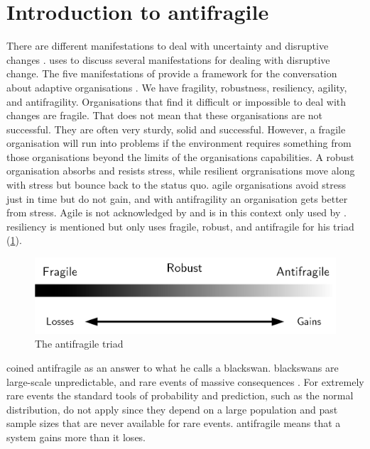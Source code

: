 \section{Introduction to antifragile}
\label{sec:introantifragility}
There are different manifestations to deal with uncertainty and disruptive changes \parencite[pp.~79--81]{Steen2018}. \textcite{Steen2018} uses \textcite{Taleb2012} to discuss several manifestations for dealing with disruptive change. The five manifestations of \textcite{Taleb2012} provide a framework for the conversation about adaptive organisations \parencite[pp.~79--81]{Steen2018}. We have \gls{fragility}, \gls{robustness}, \gls{resiliency}, \gls{agility}, and \gls{antifragility}. Organisations that find it difficult or impossible to deal with changes are fragile. That does not mean that these organisations are not successful. They are often very sturdy, solid and successful. However, a fragile organisation will run into problems if the environment requires something from those organisations beyond the limits of the organisations capabilities. A \gls{robust} organisation absorbs and resists stress, while \gls{resilient} orgranisations move along with stress but bounce back to the status quo. \Gls{agile} organisations avoid stress just in time but do not gain, and with \gls{antifragility} an organisation gets better from stress. Agile is not acknowledged by \textcite{Taleb2012} and is in this context only used by \textcite{Steen2018}. \Gls{resiliency} is mentioned but \textcite{Taleb2012} only uses \gls{fragile}, \gls{robust}, and \gls{antifragile} for his \gls{triad} (\cref{fig:antifragilesimple}).
\begin{figure}[H]
	\centering
	\includegraphics[width=0.6\linewidth]{images/antifragilesimple}
	\caption[The antifragile triad]{The antifragile triad}
	\label{fig:antifragilesimple}
\end{figure}
\textcite{Taleb2012} coined \gls{antifragile} as an answer to what he calls a \gls{blackswan}. \Glspl{blackswan} are large-scale unpredictable, and rare events of massive consequences \parencite[p.~6]{Taleb2012}. For extremely rare events the standard tools of probability and prediction, such as the normal distribution, do not apply since they depend on a large population and past sample sizes that are never available for rare events. \Gls{antifragile} means that a system gains more than it loses. 


